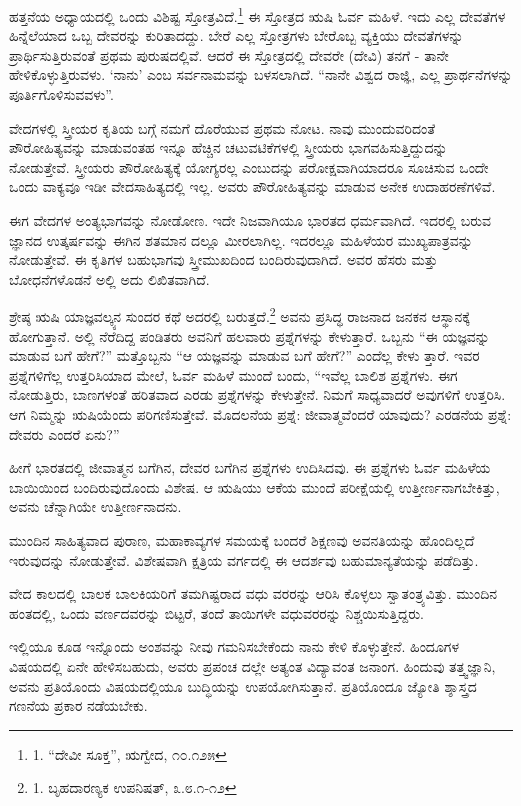 ಹತ್ತನೆಯ ಅಧ್ಯಾಯದಲ್ಲಿ ಒಂದು ವಿಶಿಷ್ಟ ಸ್ತೋತ್ರವಿದೆ.\footnote{1. “ದೇವೀ ಸೂಕ್ತ”, ಋಗ್ವೇದ, ೧೦.೧೨೫} ಈ ಸ್ತೋತ್ರದ ಋಷಿ ಓರ್ವ ಮಹಿಳೆ. ಇದು ಎಲ್ಲ ದೇವತೆಗಳ ಹಿನ್ನೆಲೆಯಾದ ಒಬ್ಬ ದೇವರನ್ನು ಕುರಿತಾದದ್ದು. ಬೇರೆ ಎಲ್ಲ ಸ್ತೋತ್ರಗಳು ಬೇರೊಬ್ಬ ವ್ಯಕ್ತಿಯು ದೇವತೆಗಳನ್ನು ಪ್ರಾರ್ಥಿಸುತ್ತಿರುವಂತೆ ಪ್ರಥಮ ಪುರುಷದಲ್ಲಿವೆ. ಆದರೆ ಈ ಸ್ತೋತ್ರದಲ್ಲಿ ದೇವರೇ (ದೇವಿ) ತನಗೆ - ತಾನೇ ಹೇಳಿಕೊಳ್ಳುತ್ತಿರುವಳು. ‘ನಾನು’ ಎಂಬ ಸರ್ವನಾಮವನ್ನು ಬಳಸಲಾಗಿದೆ. “ನಾನೇ ವಿಶ್ವದ ರಾಜ್ಞಿ, ಎಲ್ಲ ಪ್ರಾರ್ಥನೆಗಳನ್ನು ಪೂರ್ತಿಗೊಳಿಸುವವಳು”.

ವೇದಗಳಲ್ಲಿ ಸ್ತ್ರೀಯರ ಕೃತಿಯ ಬಗ್ಗೆ ನಮಗೆ ದೊರೆಯುವ ಪ್ರಥಮ ನೋಟ. ನಾವು ಮುಂದುವರಿದಂತೆ ಪೌರೋಹಿತ್ಯವನ್ನು ಮಾಡುವಂತಹ ಇನ್ನೂ ಹೆಚ್ಚಿನ ಚಟುವಟಿಕೆಗಳಲ್ಲಿ ಸ್ತ್ರೀಯರು ಭಾಗವಹಿಸುತ್ತಿದ್ದುದನ್ನು ನೋಡುತ್ತೇವೆ. ಸ್ತ್ರೀಯರು ಪೌರೋಹಿತ್ಯಕ್ಕೆ ಯೋಗ್ಯರಲ್ಲ ಎಂಬುದನ್ನು ಪರೋಕ್ಷವಾಗಿಯಾದರೂ ಸೂಚಿಸುವ ಒಂದೇ ಒಂದು ವಾಕ್ಯವೂ ಇಡೀ ವೇದಸಾಹಿತ್ಯದಲ್ಲಿ ಇಲ್ಲ. ಅವರು ಪೌರೋಹಿತ್ಯವನ್ನು ಮಾಡುವ ಅನೇಕ ಉದಾಹರಣೆಗಳಿವೆ.

ಈಗ ವೇದಗಳ ಅಂತ್ಯಭಾಗವನ್ನು ನೋಡೋಣ. ಇದೇ ನಿಜವಾಗಿಯೂ ಭಾರತದ ಧರ್ಮವಾಗಿದೆ. ಇದರಲ್ಲಿ ಬರುವ ಜ್ಞಾನದ ಉತ್ಕರ್ಷವನ್ನು ಈಗಿನ ಶತಮಾನ ದಲ್ಲೂ ಮೀರಲಾಗಿಲ್ಲ. ಇದರಲ್ಲೂ ಮಹಿಳೆಯರ ಮುಖ್ಯಪಾತ್ರವನ್ನು ನೋಡುತ್ತೇವೆ. ಈ ಕೃತಿಗಳ ಬಹುಭಾಗವು ಸ್ತ್ರೀಮುಖದಿಂದ ಬಂದಿರುವುದಾಗಿದೆ. ಅವರ ಹೆಸರು ಮತ್ತು ಬೋಧನೆಗಳೊಡನೆ ಅಲ್ಲಿ ಅದು ಲಿಖಿತವಾಗಿದೆ.

ಶ್ರೇಷ್ಠ ಋಷಿ ಯಾಜ್ಞವಲ್ಕ್ಯನ ಸುಂದರ ಕಥೆ ಅದರಲ್ಲಿ ಬರುತ್ತದೆ.\footnote{1. ಬೃಹದಾರಣ್ಯಕ ಉಪನಿಷತ್, ೩.೮.೧-೧೨} ಅವನು ಪ್ರಸಿದ್ಧ ರಾಜನಾದ ಜನಕನ ಆಸ್ಥಾನಕ್ಕೆ ಹೋಗುತ್ತಾನೆ. ಅಲ್ಲಿ ನೆರೆದಿದ್ದ ಪಂಡಿತರು ಅವನಿಗೆ ಹಲವಾರು ಪ್ರಶ್ನೆಗಳನ್ನು ಕೇಳುತ್ತಾರೆ. ಒಬ್ಬನು “ಈ ಯಜ್ಞವನ್ನು ಮಾಡುವ ಬಗೆ ಹೇಗೆ?” ಮತ್ತೊಬ್ಬನು “ಆ ಯಜ್ಞವನ್ನು ಮಾಡುವ ಬಗೆ ಹೇಗೆ?” ಎಂದೆಲ್ಲ ಕೇಳು ತ್ತಾರೆ. ಇವರ ಪ್ರಶ್ನೆಗಳಿಗೆಲ್ಲ ಉತ್ತರಿಸಿಯಾದ ಮೇಲೆ, ಓರ್ವ ಮಹಿಳೆ ಮುಂದೆ ಬಂದು, “ಇವೆಲ್ಲ ಬಾಲಿಶ ಪ್ರಶ್ನೆಗಳು. ಈಗ ನೋಡುತ್ತಿರು, ಬಾಣಗಳಂತೆ ಹರಿತವಾದ ಎರಡು ಪ್ರಶ್ನೆಗಳನ್ನು ಕೇಳುತ್ತೇನೆ. ನಿಮಗೆ ಸಾಧ್ಯವಾದರೆ ಅವುಗಳಿಗೆ ಉತ್ತರಿಸಿ. ಆಗ ನಿಮ್ಮನ್ನು ಋಷಿಯೆಂದು ಪರಿಗಣಿಸುತ್ತೇವೆ. ಮೊದಲನೆಯ ಪ್ರಶ್ನೆ: ಜೀವಾತ್ಮವೆಂದರೆ ಯಾವುದು? ಎರಡನೆಯ ಪ್ರಶ್ನೆ: ದೇವರು ಎಂದರೆ ಏನು?”

ಹೀಗೆ ಭಾರತದಲ್ಲಿ ಜೀವಾತ್ಮನ ಬಗೆಗಿನ, ದೇವರ ಬಗೆಗಿನ ಪ್ರಶ್ನೆಗಳು ಉದಿಸಿದವು. ಈ ಪ್ರಶ್ನೆಗಳು ಓರ್ವ ಮಹಿಳೆಯ ಬಾಯಿಯಿಂದ ಬಂದಿರುವುದೊಂದು ವಿಶೇಷ. ಆ ಋಷಿಯು ಆಕೆಯ ಮುಂದೆ ಪರೀಕ್ಷೆಯಲ್ಲಿ ಉತ್ತೀರ್ಣನಾಗಬೇಕಿತ್ತು, ಅವನು ಚೆನ್ನಾಗಿಯೇ ಉತ್ತೀರ್ಣನಾದನು.

ಮುಂದಿನ ಸಾಹಿತ್ಯವಾದ ಪುರಾಣ, ಮಹಾಕಾವ್ಯಗಳ ಸಮಯಕ್ಕೆ ಬಂದರೆ ಶಿಕ್ಷಣವು ಅವನತಿಯನ್ನು ಹೊಂದಿಲ್ಲದೆ ಇರುವುದನ್ನು ನೋಡುತ್ತೇವೆ. ವಿಶೇಷವಾಗಿ ಕ್ಷತ್ರಿಯ ವರ್ಗದಲ್ಲಿ ಈ ಆದರ್ಶವು ಬಹುಮಾನ್ಯತೆಯನ್ನು ಪಡೆದಿತ್ತು.

ವೇದ ಕಾಲದಲ್ಲಿ ಬಾಲಕ ಬಾಲಕಿಯರಿಗೆ ತಮಗಿಷ್ಟರಾದ ವಧು ವರರನ್ನು ಆರಿಸಿ ಕೊಳ್ಳಲು ಸ್ವಾತಂತ್ರ್ಯವಿತ್ತು. ಮುಂದಿನ ಹಂತದಲ್ಲಿ, ಒಂದು ವರ್ಣದವರನ್ನು ಬಿಟ್ಟರೆ, ತಂದೆ ತಾಯಿಗಳೇ ವಧುವರರನ್ನು ನಿಶ್ಚಯಿಸುತ್ತಿದ್ದರು.

ಇಲ್ಲಿಯೂ ಕೂಡ ಇನ್ನೊಂದು ಅಂಶವನ್ನು ನೀವು ಗಮನಿಸಬೇಕೆಂದು ನಾನು ಕೇಳಿ ಕೊಳ್ಳುತ್ತೇನೆ. ಹಿಂದೂಗಳ ವಿಷಯದಲ್ಲಿ ಏನೇ ಹೇಳಿಸಬಹುದು, ಅವರು ಪ್ರಪಂಚ ದಲ್ಲೇ ಅತ್ಯಂತ ವಿದ್ಯಾವಂತ ಜನಾಂಗ. ಹಿಂದುವು ತತ್ತ್ವಜ್ಞಾನಿ, ಅವನು ಪ್ರತಿಯೊಂದು ವಿಷಯದಲ್ಲಿಯೂ ಬುದ್ಧಿಯನ್ನು ಉಪಯೋಗಿಸುತ್ತಾನೆ. ಪ್ರತಿಯೊಂದೂ ಜ್ಯೋತಿ ಶ್ಶಾಸ್ತ್ರದ ಗಣನೆಯ ಪ್ರಕಾರ ನಡೆಯಬೇಕು.

